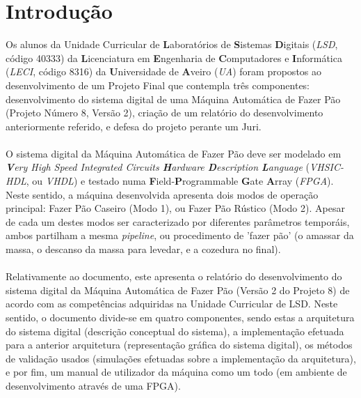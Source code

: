 \documentclass{report}
\begin{document}
\tableofcontents
\listoffigures    %


\clearpage
{}

\chapter{Introdução}
\label{chap.introducao}
Os alunos da Unidade Curricular de \textbf{L}aboratórios de \textbf{S}istemas \textbf{D}igitais (\textit{LSD}, código 40333) da \textbf{L}icenciatura em \textbf{E}ngenharia de \textbf{C}omputadores e \textbf{I}nformática (\textit{LECI}, código 8316) da \textbf{U}niversidade de \textbf{A}veiro (\textit{UA}) foram propostos ao desenvolvimento de um Projeto Final que contempla três componentes: desenvolvimento do sistema digital de uma Máquina Automática de Fazer Pão (Projeto Número 8, Versão 2), criação de um relatório do desenvolvimento anteriormente referido, e defesa do projeto perante um Juri.
\\\\
O sistema digital da Máquina Automática de Fazer Pão deve ser modelado em \textit{\textbf{V}ery High Speed Integrated Circuits \textbf{H}ardware \textbf{D}escription \textbf{L}anguage} (\textit{VHSIC-HDL}, ou \textit{VHDL}) e testado numa \textbf{F}ield-\textbf{P}rogrammable \textbf{G}ate \textbf{A}rray (\textit{FPGA}). Neste sentido, a máquina desenvolvida apresenta dois modos de operação principal: Fazer Pão Caseiro (Modo 1), ou Fazer Pão Rústico (Modo 2). Apesar de cada um destes modos ser caracterizado por diferentes parâmetros temporáis, ambos partilham a mesma \textit{pipeline}, ou procedimento de 'fazer pão'  (o amassar da massa, o descanso da massa para levedar, e a cozedura no final).
\\\\
Relativamente ao documento, este apresenta o relatório do desenvolvimento do sistema digital da Máquina Automática de Fazer Pão (Versão 2 do Projeto 8) de acordo com as competências adquiridas na Unidade Curricular de LSD.
Neste sentido, o documento divide-se em quatro componentes, sendo estas a arquitetura do sistema digital (descrição conceptual do sistema), a implementação efetuada para a anterior arquitetura (representação gráfica do sistema digital), os métodos de validação usados (simulações efetuadas sobre a implementação da arquitetura), e por fim, um manual de utilizador da máquina como um todo (em ambiente de desenvolvimento através de uma FPGA).
\end{document}
